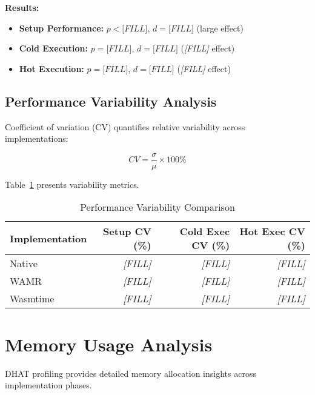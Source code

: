 \textbf{Results:}
\begin{itemize}
    \item \textbf{Setup Performance:} $p < \textit{[FILL]}$, $d = \textit{[FILL]}$ (large effect)
    \item \textbf{Cold Execution:} $p = \textit{[FILL]}$, $d = \textit{[FILL]}$ (\textit{[FILL]} effect)
    \item \textbf{Hot Execution:} $p = \textit{[FILL]}$, $d = \textit{[FILL]}$ (\textit{[FILL]} effect)
\end{itemize}

\subsection{Performance Variability Analysis}
\label{subsec:variability-analysis}

Coefficient of variation (CV) quantifies relative variability across implementations:

\begin{equation}
CV = \frac{\sigma}{\mu} \times 100\%
\end{equation}

Table~\ref{tab:variability-analysis} presents variability metrics.

\begin{table}[htbp]
\centering
\caption{Performance Variability Comparison}
\label{tab:variability-analysis}
\begin{tabular}{lrrr}
\toprule
\textbf{Implementation} & \textbf{Setup CV (\%)} & \textbf{Cold Exec CV (\%)} & \textbf{Hot Exec CV (\%)} \\
\midrule
Native       & \textit{[FILL]} & \textit{[FILL]} & \textit{[FILL]} \\
WAMR         & \textit{[FILL]} & \textit{[FILL]} & \textit{[FILL]} \\
Wasmtime     & \textit{[FILL]} & \textit{[FILL]} & \textit{[FILL]} \\
\bottomrule
\end{tabular}
\end{table}

\section{Memory Usage Analysis}
\label{sec:memory-analysis}

DHAT profiling provides detailed memory allocation insights across implementation phases.

